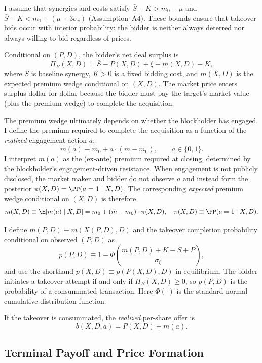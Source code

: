 I assume that synergies and costs satisfy $\bar{S}-K > m_0-\mu$ and $\bar{S}-K < m_1+(\mu+3\sigma_v)$ (Assumption~A4). These bounds ensure that takeover bids occur with interior probability: the bidder is neither always deterred nor always willing to bid regardless of prices.

Conditional on $(P,D)$, the bidder's net deal surplus is
\[
\Pi_B(X,D) = \bar{S} - P(X,D) + \xi - m(X,D) - K,
\]
where $\bar{S}$ is baseline synergy, $K > 0$ is a fixed bidding cost, and $m(X,D)$ is the expected premium wedge conditional on $(X,D)$. The market price enters surplus dollar-for-dollar because the bidder must pay the target's market value (plus the premium wedge) to complete the acquisition.

The premium wedge ultimately depends on whether the blockholder has engaged. I define the premium required to complete the acquisition as a function of the \emph{realized} engagement action $a$:
\[
m(a) \equiv m_0 + a\cdot(\tilde{m}-m_0), \qquad a\in\{0,1\}.
\]
I interpret $m(a)$ as the (ex-ante) premium required at closing, determined by the blockholder's engagement-driven resistance.
When engagement is not publicly disclosed, the market maker and bidder do not observe $a$ and instead form the posterior $\pi(X,D)=\PP(a=1 \mid X,D)$. The corresponding \emph{expected} premium wedge conditional on $(X,D)$ is therefore
\[
m(X,D) \equiv \E[m(a) \mid X,D] = m_0 + (\tilde{m} - m_0)\cdot \pi(X,D), \quad \pi(X,D) \equiv \PP(a = 1 \mid X, D).
\]

I define $m(P,D)\equiv m(X(P,D),D)$ and the takeover completion probability conditional on observed $(P,D)$ as
\begin{equation}
p(P,D) \equiv 1 - \Phi\left(\frac{m(P,D) + K - \bar{S} + P}{\sigma_\xi}\right),
\label{eq:bid-prob}
\end{equation}
and use the shorthand $p(X,D)\equiv p(P(X,D),D)$ in equilibrium. The bidder initiates a takeover attempt if and only if $\Pi_B(X,D) \geq 0$, so $p(P,D)$ is the probability of a consummated transaction.
Here $\Phi(\cdot)$ is the standard normal cumulative distribution function.

If the takeover is consummated, the \emph{realized} per-share offer is
\[
b(X,D,a) = P(X,D) + m(a).
\]

\subsection{Terminal Payoff and Price Formation}

